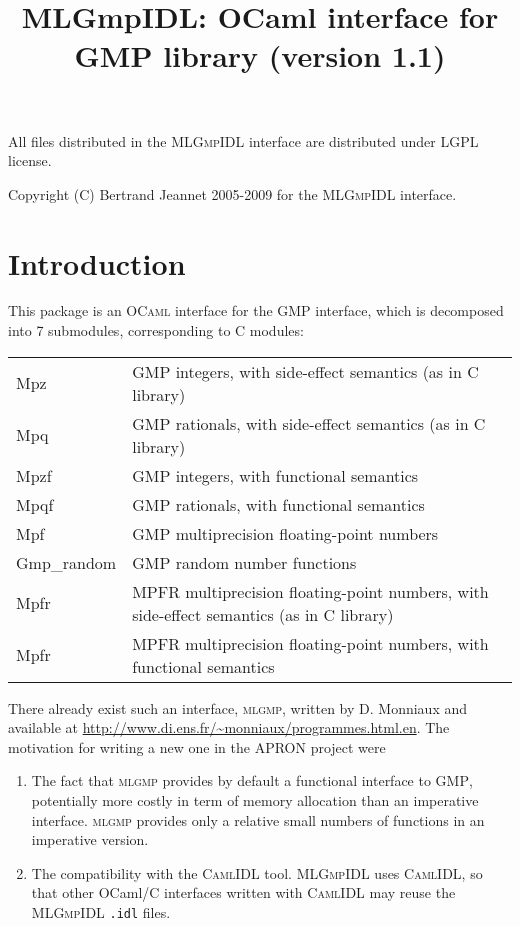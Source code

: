 \documentclass[[twoside,10pt,a4paper]{report}
\title{MLGmpIDL: OCaml interface for GMP library (version 1.1)}
\begin{document}
\maketitle


\vspace*{0.9\textheight}

All files distributed in the \textsc{MLGmpIDL} interface are
distributed under LGPL license.

Copyright (C) Bertrand Jeannet 2005-2009 for the
\textsc{MLGmpIDL} interface.

\newpage

\section*{Introduction}

This package is an \textsc{OCaml} interface for the GMP
interface, which is decomposed into 7 submodules, corresponding to C
modules:

\noindent
\begin{tabular}{l@{~:~~}l}
Mpz        & GMP integers, with side-effect semantics (as in C library) \\
Mpq        & GMP rationals, with side-effect semantics (as in C library) \\
Mpzf       & GMP integers, with functional semantics  \\
Mpqf       & GMP rationals, with functional semantics \\
Mpf        & GMP multiprecision floating-point numbers \\
Gmp\_random & GMP random number functions \\
Mpfr      & MPFR multiprecision floating-point numbers, with side-effect semantics (as in C library) \\
Mpfr      & MPFR multiprecision floating-point numbers, with functional semantics 
\end{tabular}

There already exist such an interface, \textsc{mlgmp}, written by
D. Monniaux and available at
\url{http://www.di.ens.fr/~monniaux/programmes.html.en}. The
motivation for writing a new one in the APRON project were
\begin{enumerate}
\item The fact that \textsc{mlgmp} provides by default a
  functional interface to \textsc{GMP}, potentially more costly in
  term of memory allocation than an imperative interface.
  \textsc{mlgmp} provides only a relative small numbers of
  functions in an imperative version.
\item The compatibility with the \textsc{CamlIDL} tool.
  \textsc{MLGmpIDL} uses \textsc{CamlIDL}, so that other OCaml/C
  interfaces written with \textsc{CamlIDL} may reuse the
  \textsc{MLGmpIDL} \texttt{.idl} files.
\end{enumerate}
\end{document}
